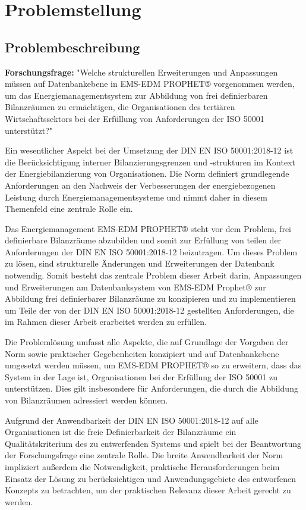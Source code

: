 \section{Problemstellung}
\subsection{Problembeschreibung}
\textbf{Forschungsfrage:} "Welche strukturellen Erweiterungen und Anpassungen müssen auf Datenbankebene in EMS-EDM PROPHET® vorgenommen werden, um das 
Energiemanagementsystem zur Abbildung von frei definierbaren Bilanzräumen zu ermächtigen, die Organisationen des tertiären Wirtschaftssektors bei der 
Erfüllung von Anforderungen der ISO 50001 unterstützt?"

Ein wesentlicher Aspekt bei der Umsetzung der DIN EN ISO 50001:2018-12 ist die Berücksichtigung interner Bilanzierungsgrenzen und -strukturen im Kontext der 
Energiebilanzierung von Organisationen. Die Norm definiert grundlegende Anforderungen an den Nachweis der Verbesserungen der energiebezogenen Leistung durch 
Energiemanagementsysteme und nimmt daher in diesem Themenfeld eine zentrale Rolle ein. 

Das Energiemanagement EMS-EDM PROPHET® steht vor dem Problem, frei definierbare Bilanzräume abzubilden und somit zur Erfüllung von teilen der Anforderungen 
der DIN EN ISO 50001:2018-12 beizutragen.
Um dieses Problem zu lösen, sind strukturelle Änderungen und Erweiterungen der Datenbank notwendig.
Somit besteht das zentrale Problem dieser Arbeit darin, Anpassungen und Erweiterungen am Datenbanksystem von EMS-EDM Prophet® zur Abbildung 
frei definierbarer Bilanzräume zu konzipieren und zu implementieren um Teile der von der DIN EN ISO 50001:2018-12 gestellten Anforderungen, die im Rahmen dieser 
Arbeit erarbeitet werden zu erfüllen.

Die Problemlösung umfasst alle Aspekte, die auf Grundlage der Vorgaben der Norm sowie praktischer Gegebenheiten konzipiert und auf Datenbankebene 
umgesetzt werden müssen, um EMS-EDM PROPHET® so zu erweitern, dass das System in der Lage ist, Organisationen bei der Erfüllung der ISO 50001 zu 
unterstützen. Dies gilt insbesondere für Anforderungen, die durch die Abbildung von Bilanzräumen adressiert werden können.

Aufgrund der Anwendbarkeit der DIN EN ISO 50001:2018-12 auf alle Organisationen ist die freie Definierbarkeit der Bilanzräume ein Qualitätskriterium des zu 
entwerfenden Systems und spielt bei der Beantwortung der Forschungsfrage eine zentrale Rolle.
Die breite Anwendbarkeit der Norm impliziert außerdem die Notwendigkeit, praktische Herausforderungen beim Einsatz der Lösung zu berücksichtigen und 
Anwendungsgebiete des entworfenen Konzepts zu betrachten, um der praktischen Relevanz dieser Arbeit gerecht zu werden.

